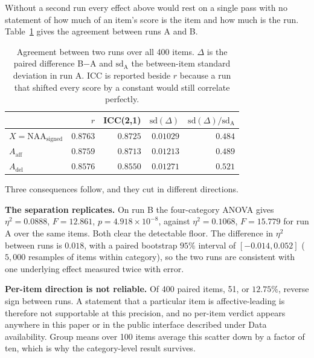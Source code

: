 \documentclass[preprint,12pt]{elsarticle}
\begin{document}
Without a second run every effect above would rest on a single pass with no statement of how
much of an item's score is the item and how much is the run. Table~\ref{tab:retest} gives the
agreement between runs A and B.

\begin{table}[htbp]
\centering
\begin{tabular}{@{}lrrrr@{}}
\toprule
& $r$ & ICC(2,1) & $\mathrm{sd}(\Delta)$ & $\mathrm{sd}(\Delta)/\mathrm{sd}_{\text{A}}$ \\
\midrule
$X = \mathrm{NAA}_{\text{signed}}$ & $0.8763$ & $0.8725$ & $0.01029$ & $0.484$ \\
$A_{\text{aff}}$ & $0.8759$ & $0.8713$ & $0.01213$ & $0.489$ \\
$A_{\text{del}}$ & $0.8576$ & $0.8550$ & $0.01271$ & $0.521$ \\
\bottomrule
\end{tabular}
\caption{Agreement between two runs over all 400 items. $\Delta$ is the paired difference
B$-$A and $\mathrm{sd}_{\text{A}}$ the between-item standard deviation in run A. ICC is
reported beside $r$ because a run that shifted every score by a constant would still
correlate perfectly.}
\label{tab:retest}
\end{table}

Three consequences follow, and they cut in different directions.

\textbf{The separation replicates.} On run B the four-category ANOVA gives
$\eta^2 = 0.0888$, $F = 12.861$, $p = 4.918\times10^{-8}$, against $\eta^2 = 0.1068$,
$F = 15.779$ for run A over the same items. Both clear the detectable floor. The difference
in $\eta^2$ between runs is $0.018$, with a paired bootstrap $95\%$ interval of
$[-0.014, 0.052]$ ($5{,}000$ resamples of items within category), so the two runs are
consistent with one underlying effect measured twice with error.

\textbf{Per-item direction is not reliable.} Of 400 paired items, 51, or $12.75\%$, reverse
sign between runs. A statement that a particular item is affective-leading is therefore not
supportable at this precision, and no per-item verdict appears anywhere in this paper or
in the public interface described under Data availability. Group means over 100 items average
this scatter down by a factor of ten, which is why the category-level result survives.
\end{document}
